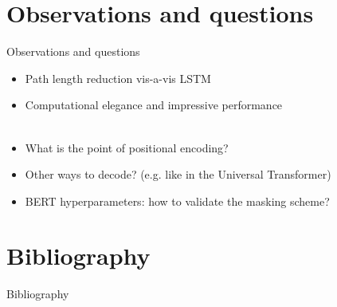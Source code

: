 \documentclass{beamer}
\begin{document}
\section{Observations and questions}
\begin{frame}{Observations and questions}
\begin{itemize}
	\item Path length reduction vis-a-vis LSTM
	\item Computational elegance and impressive performance
	\ \\
	\ \\
	\item What is the point of positional encoding?
	\item Other ways to decode? (e.g. like in the Universal Transformer)
	\item BERT hyperparameters: how to validate the masking scheme?
\end{itemize}
\end{frame}



\section{Bibliography}
\begin{frame}[allowframebreaks]{Bibliography}


\end{frame}



\end{document}
